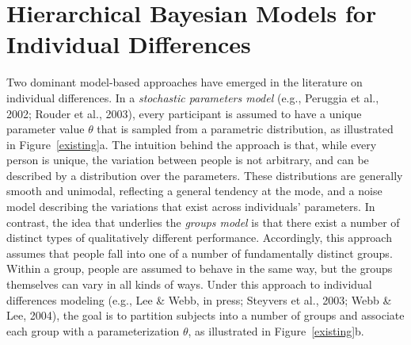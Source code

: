 \documentclass[authoryear]{elsarticle}
\newcommand{\panel}[1]{#1}
\begin{document}
\section{Hierarchical Bayesian Models for Individual Differences}

Two dominant model-based approaches have emerged in the literature on
individual differences. In a \emph{stochastic parameters model}
(e.g., Peruggia et al., 2002; Rouder et al., 2003), every participant
is assumed to have a unique parameter value $\theta$ that is
sampled from a parametric distribution, as illustrated in
Figure~\ref{existing}\panel{a}. The intuition behind the approach is that,
while every person is unique, the variation between people is not arbitrary,
and can be described by a distribution over the parameters. These
distributions are generally smooth and unimodal, reflecting a general
tendency at the mode, and a noise model describing the
variations that exist across individuals' parameters.
In contrast, the idea that underlies the \emph{groups model}
is that there exist a number of distinct types of
qualitatively different performance. Accordingly, this approach assumes that people fall
into one of a number of fundamentally
distinct groups. Within a group, people are assumed to behave in
 the same way, but the groups themselves can vary in all kinds of ways.
 Under this approach to individual differences modeling
(e.g., Lee \& Webb, in press; Steyvers et al., 2003; Webb \& Lee, 2004),
the goal is to partition subjects into a number of groups and associate each
group with a parameterization $\theta$, as illustrated in Figure~\ref{existing}\panel{b}.
\end{document}
